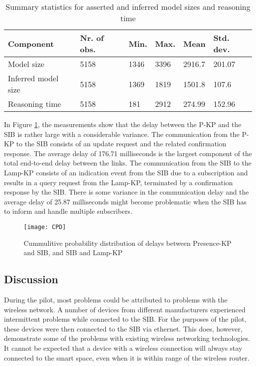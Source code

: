 \begin{table}[!t]
\caption{Summary statistics for asserted and inferred model sizes and reasoning time}
\label{summarySIB}
\centering
\begin{tabular}{|l|l|l|l|l|l|}
\hline
Component &	 Nr. of obs. & Min. & Max. & Mean &	Std. dev.\\
\hline
Model size	& 5158 & 1346 &	3396 &	2916.7 & 201.07 \\
Inferred model size &	5158 &	1369 &	1819 &	1501.8 & 107.6 \\
Reasoning time & 5158 &	181 & 2912 & 274.99 & 152.96 \\
\hline
\end{tabular}
\end{table}

In Figure \ref{CPD}, the measurements show that the delay between the P-KP and the SIB is rather large with a considerable variance. The communication from the P-KP to the SIB consists of an update request and the related confirmation response. The average delay of 176.71 milliseconds is the largest component of the total end-to-end delay between the links. The communication from the SIB to the Lamp-KP consists of an indication event from the SIB due to a subscription and results in a query request from the Lamp-KP, terminated by a confirmation response by the SIB. There is some variance in the communication delay and the average delay of 25.87 milliseconds might become problematic when the SIB has to inform and handle multiple subscribers.

\begin{figure}
\centering
\texttt{[image: CPD]}
\caption{Cummulitive probability distribution of delays between Presence-KP and SIB, and SIB and Lamp-KP}
\label{CPD}
\end{figure}

\subsection{Discussion}

During the pilot, most problems could be attributed to problems with the wireless network. A number of devices from different manufacturers experienced intermittent problems while connected to the SIB. For the purposes of the pilot, these devices were then connected to the SIB via ethernet. This does, however, demonstrate some of the problems with existing wireless networking technologies. It cannot be expected that a device with a wireless connection will always stay connected to the smart space, even when it is within range of the wireless router.

